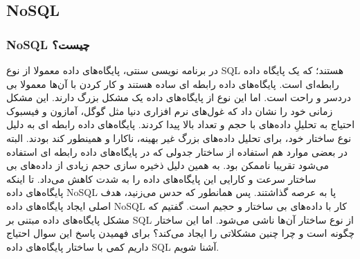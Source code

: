 \subsection{NoSQL}
\subsubsection{NoSQL چیست؟}
در برنامه نویسی سنتی، پایگاه‌های داده معمولا از نوع SQL هستند؛ که یک پایگاه داده 
رابطه‌ای 
 است. پایگاه‌های داده رابطه ای ساده هستند و کار کردن با آن‌ها معمولا بی دردسر و راحت است. اما این نوع از پایگاه‌های داده یک مشکل بزرگ دارند. این مشکل زمانی خود را نشان داد که غول‌های نرم افزاری دنیا مثل گوگل، آمازون و فیسبوک احتیاج به تحلیلِ داده‌های با حجم و تعداد 
 بالا
 پیدا کردند.
پایگاه‌های داده رابطه ای به دلیل نوع ساختار خود، برای تحلیل داده‌های بزرگ غیر بهینه، ناکارا و همینطور کند بودند. البته در بعضی موارد هم استفاده از ساختار جدولی که در پایگاه‌های داده رابطه ای استفاده می‌شود تقریبا ناممکن بود. به همین دلیل ذخیره سازی حجم زیادی از داده‌های بی ساختار
 سرعت و کارایی این پایگاه‌های داده را به شدت کاهش می‌داد. تا اینکه پایگاه‌های داده NoSQL پا به عرصه گذاشتند. پس همانطور که حدس می‌زنید، هدف اصلی ایجاد پایگاه‌های داده NoSQL کار با داده‌های بی ساختار و حجیم است.
گفتیم که مشکل پایگاه‌های داده مبتنی بر SQL از نوع ساختار آن‌ها ناشی می‌شود. اما این ساختار چگونه است و چرا چنین مشکلاتی را ایجاد می‌کند؟ برای فهمیدن پاسخ این سوال احتیاج داریم کمی با ساختار پایگاه‌های داده SQL آشنا شویم.

